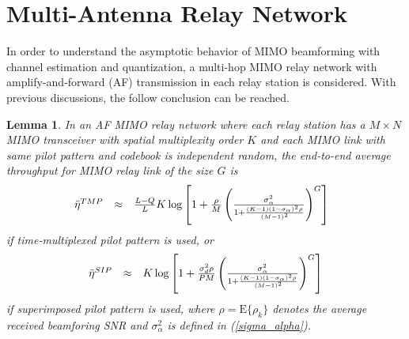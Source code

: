 \documentclass[conference]{IEEEtran}
\newtheorem{lemma}{Lemma}
\begin{document}
\section{Multi-Antenna Relay Network}
In order to understand the asymptotic behavior of MIMO beamforming
with channel estimation and quantization, a multi-hop MIMO relay
network with amplify-and-forward (AF) transmission in each relay
station is considered. With previous discussions, the follow
conclusion can be reached.
\begin{lemma}
In an AF MIMO relay network where each relay station has a
$M\times N$ MIMO transceiver with spatial multiplexity order $K$
and each MIMO link with same pilot pattern and codebook is
independent random, the end-to-end average throughput for MIMO
relay link of the size $G$ is
\begin{equation}\hspace{-0.10in}
\begin{array}{rcl}
\bar\eta^{\mbox{\tiny
TMP}}&\approx&\frac{L-Q}{L}K\log\left[1+\frac{\rho}{M}\left(\frac{\sigma_{\alpha}^{2}}{1+\frac{(K-1)(1-\sigma_{\alpha})^2\rho}{(M-1)^2}}\right)^{G}\right]
\end{array}\label{RN_TM}
\end{equation}
\noindent if time-multiplexed pilot pattern is used, or
\begin{equation}%
\begin{array}{rcl}
\bar\eta^{\mbox{\tiny
SIP}}&\approx&K\log\left[1+\frac{\sigma_{d}^{2}\rho}{PM}\left(\frac{\sigma_{\alpha}^{2}}{1+\frac{(K-1)(1-\sigma_{\alpha})^2\rho}{(M-1)^2}}\right)^{G}\right]
\end{array}\label{RN_SI}
\end{equation}
\noindent if superimposed pilot pattern is used, where
$\rho=\mbox{E}\{\rho_{k}\}$ denotes the average received
beamforing SNR and $\sigma_{\alpha}^{2}$ is defined in
(\ref{sigma_alpha}).
\end{lemma}
\begin{figure}
\end{figure}
\end{document}
